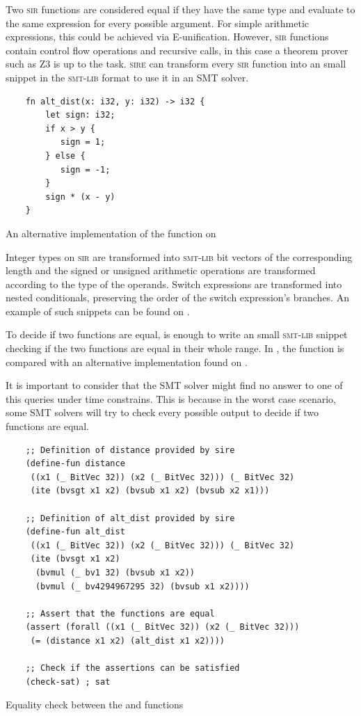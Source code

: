 Two \textsc{sir} functions are considered equal if they have the same type and
evaluate to the same expression for every possible argument. For simple
arithmetic expressions, this could be achieved via E-unification. However,
\textsc{sir} functions contain control flow operations and recursive calls, in
this case a theorem prover such as Z3 is up to the task. \textsc{sire} can
transform every \textsc{sir} function into an small snippet in the
\textsc{smt-lib} format to use it in an SMT solver.

\begin{listing}[h]
    \begin{verbatim}
    fn alt_dist(x: i32, y: i32) -> i32 {
        let sign: i32; 
        if x > y {
           sign = 1;
        } else {
           sign = -1;
        }
        sign * (x - y)
    }
    \end{verbatim}
    \caption{An alternative implementation of the  function on }
  \label{lst:alt_distance}
\end{listing}

Integer types on \textsc{sir} are transformed into \textsc{smt-lib} bit vectors
of the corresponding length and the signed or unsigned arithmetic operations
are transformed according to the type of the operands. Switch expressions are
transformed into nested conditionals, preserving the order of the switch
expression's branches. An example of such snippets can be found on
. 

To decide if two functions are equal, is enough to write an small
\textsc{smt-lib} snippet checking if the two functions are equal in their whole
range. In , the  function is compared
with an alternative implementation found on . 

It is important to consider that the SMT solver might find no answer to one of
this queries under time constrains. This is because in the worst case scenario,
some SMT solvers will try to check every possible output to decide if two
functions are equal. 

\begin{listing}[H]
    \begin{verbatim}
    ;; Definition of distance provided by sire
    (define-fun distance 
     ((x1 (_ BitVec 32)) (x2 (_ BitVec 32))) (_ BitVec 32) 
     (ite (bvsgt x1 x2) (bvsub x1 x2) (bvsub x2 x1)))

    ;; Definition of alt_dist provided by sire
    (define-fun alt_dist 
     ((x1 (_ BitVec 32)) (x2 (_ BitVec 32))) (_ BitVec 32) 
     (ite (bvsgt x1 x2) 
      (bvmul (_ bv1 32) (bvsub x1 x2)) 
      (bvmul (_ bv4294967295 32) (bvsub x1 x2))))
    
    ;; Assert that the functions are equal
    (assert (forall ((x1 (_ BitVec 32)) (x2 (_ BitVec 32))) 
     (= (distance x1 x2) (alt_dist x1 x2)))) 

    ;; Check if the assertions can be satisfied
    (check-sat) ; sat
    \end{verbatim}
    \caption{Equality check between the  and  functions}
  \label{lst:func_equality}
\end{listing}


